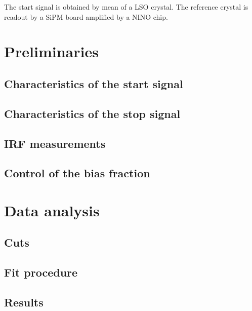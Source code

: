 The start signal is obtained by mean of a LSO crystal. The reference crystal is readout by a SiPM board amplified by a NINO chip. 



\section{Preliminaries}

\subsection{Characteristics of the start signal}


\subsection{Characteristics of the stop signal}




\subsection{IRF measurements}


\subsection{Control of the bias fraction}

\section{Data analysis}

\subsection{Cuts}

\subsection{Fit procedure}

\subsection{Results}